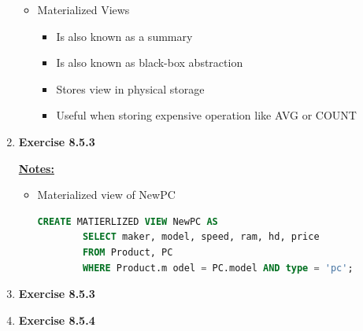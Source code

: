 \documentclass[12pt]{article}
\begin{document}
\begin{enumerate}[1.]
    \bigskip

    \begin{itemize}
        \item Materialized Views
        \begin{itemize}
            \item Is also known as a summary
            \item Is also known as black-box abstraction
            \item Stores view in physical storage
            \item Useful when storing expensive operation like AVG or COUNT
        \end{itemize}
    \end{itemize}
    \item \textbf{Exercise 8.5.3}

    \bigskip

    \underline{\textbf{Notes:}}

    \begin{itemize}
        \item Materialized view of NewPC

    \begin{lstlisting}[language=SQL]
    CREATE MATIERLIZED VIEW NewPC AS
        SELECT maker, model, speed, ram, hd, price
        FROM Product, PC
        WHERE Product.m odel = PC.model AND type = 'pc';
    \end{lstlisting}

    \end{itemize}

    \item \textbf{Exercise 8.5.3}

    \item \textbf{Exercise 8.5.4}

\end{enumerate}
\end{document}
